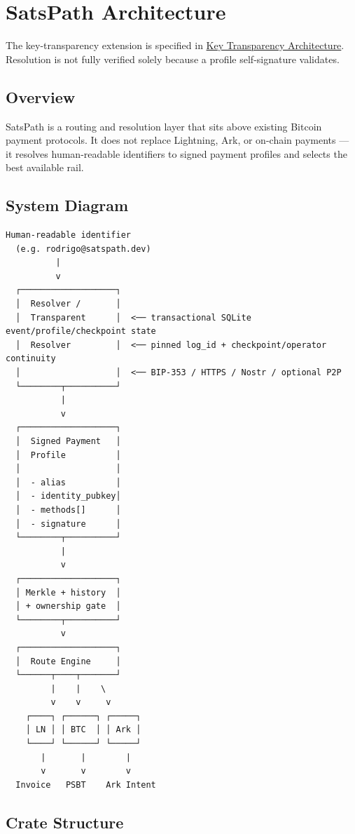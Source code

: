\documentclass[
]{article}
\author{}
\date{}
\begin{document}
\hypertarget{satspath-architecture}{%
\section{SatsPath Architecture}\label{satspath-architecture}}

The key-transparency extension is specified in
\href{key_transparency.md}{Key Transparency Architecture}. Resolution is
not fully verified solely because a profile self-signature validates.

\hypertarget{overview}{%
\subsection{Overview}\label{overview}}

SatsPath is a routing and resolution layer that sits above existing
Bitcoin payment protocols. It does not replace Lightning, Ark, or
on-chain payments --- it resolves human-readable identifiers to signed
payment profiles and selects the best available rail.

\hypertarget{system-diagram}{%
\subsection{System Diagram}\label{system-diagram}}

\begin{verbatim}
Human-readable identifier
  (e.g. rodrigo@satspath.dev)
          |
          v
  ┌───────────────────┐
  │  Resolver /       │
  │  Transparent      │  <── transactional SQLite event/profile/checkpoint state
  │  Resolver         │  <── pinned log_id + checkpoint/operator continuity
  │                   │  <── BIP-353 / HTTPS / Nostr / optional P2P
  └────────┬──────────┘
           |
           v
  ┌───────────────────┐
  │  Signed Payment   │
  │  Profile          │
  │                   │
  │  - alias          │
  │  - identity_pubkey│
  │  - methods[]      │
  │  - signature      │
  └────────┬──────────┘
           |
           v
  ┌───────────────────┐
  │ Merkle + history  │
  │ + ownership gate  │
  └────────┬──────────┘
           v
  ┌───────────────────┐
  │  Route Engine     │
  └──────┬────┬───────┘
         |    |    \
         v    v     v
    ┌────┐ ┌──────┐ ┌─────┐
    │ LN │ │ BTC  │ │ Ark │
    └────┘ └──────┘ └─────┘
       |       |        |
       v       v        v
  Invoice   PSBT    Ark Intent
\end{verbatim}

\hypertarget{crate-structure}{%
\subsection{Crate Structure}\label{crate-structure}}
\end{document}
